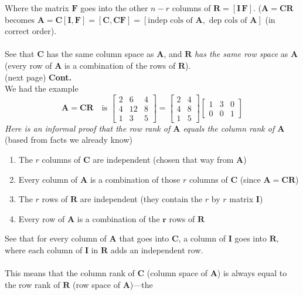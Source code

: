 \documentclass{report}
\begin{document}
Where the matrix $\bm F$ goes into the other $n-r$ columns of $\bm R=[\bm{I\,\bm F}]$. ($\bm A=\bm{CR}$ becomes $\bm A=\bm{C[I,F]}=\bm{[C,CF]}=
[\text{indep cols of $\bm A$},\text{ dep cols of $\bm A$}]$ (in correct order).\\
\vspace{1mm}\\
See that $\bm C$ has the same column space as $\bm A$, and $\bm R$ \textit{has the same row space} as $\bm A$ (every row of $\bm A$ is a combination of the rows
of $\bm R$).\\
(next page)\newpage
\noindent\textbf{Cont.}\\
We had the example
\begin{equation*}
\bm A=\bm{CR}\quad\text{is }\left[\begin{array}{ccc}
2&6&4\\
4&12&8\\
1&3&5
\end{array}\right]=
\left[\begin{array}{cc}
2&4\\
4&8\\
1&5
\end{array}\right]
\left[\begin{array}{ccc}
1&3&0\\
0&0&1
\end{array}\right]
\end{equation*}
\textit{Here is an informal proof that the row rank of $\bm A$ equals the column rank of $\bm A$} (based from facts we already know)
\begin{enumerate}
\item The $r$ columns of $\bm C$ are independent (chosen that way from $\bm A$)
\item Every column of $\bm A$ is a combination of those $r$ columns of $\bm C$ (since $\bm A=\bm{CR}$)
\item The $r$ rows of $\bm R$ are independent (they contain the $r$ by $r$ matrix $\bm I$)
\item Every row of $\bm A$ is a combination of the $\bm r$ rows of $\bm R$
\end{enumerate}
See that for every column of $\bm A$ that goes into $\bm C$, a column of $\bm I$ goes into $\bm R$, where each column of $\bm I$ in $\bm R$ adds an independent row.\\
\vspace{1mm}\\
This means that the column rank of $\bm C$ (column space of $\bm A$) is always equal to the row rank of $\bm R$ (row space of $\bm A$)---the 
\end{document}
